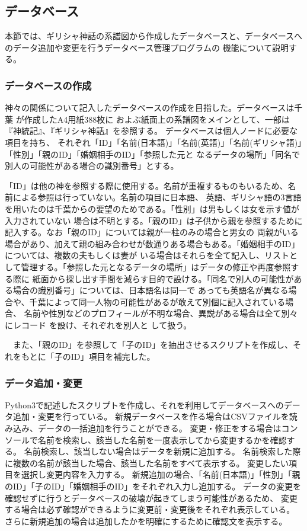 \subsection{データベース}
\label{tag:database}
本節では、ギリシャ神話の系譜図から作成したデータベースと、データベースへのデータ追加や変更を行うデータベース管理プログラムの
機能について説明する。

\subsubsection{データベースの作成}
\label{tag:createDB}
  神々の関係について記入したデータベースの作成を目指した。データベースは千葉\cite{chiba} が作成したA4用紙388枚に
  およぶ紙面上の系譜図をメインとして、一部は『神統記』\cite{theogony}、『ギリシャ神話』\cite{mythology}を参照する。
  データベースは個人ノードに必要な項目を持ち、
  それぞれ「ID」「名前(日本語)」「名前(英語)」「名前(ギリシャ語)」「性別」「親のID」「婚姻相手のID」「参照した元と
  なるデータの場所」「同名で別人の可能性がある場合の識別番号」とする。

  「ID」は他の神を参照する際に使用する。名前が重複するものもいるため、名前による参照は行っていない。名前の項目に日本語、
  英語、ギリシャ語の3言語を用いたのは千葉からの要望のためである。「性別」は男もしくは女を示す値が入力されていない
  場合は不明とする。「親のID」は子供から親を参照するために記入する。なお「親のID」については親が一柱のみの場合と男女の
  両親がいる場合があり、加えて親の組み合わせが数通りある場合もある。「婚姻相手のID」については、複数の夫もしくは妻が
  いる場合はそれらを全て記入し、リストとして管理する。「参照した元となるデータの場所」はデータの修正や再度参照する際に
  紙面から探し出す手間を減らす目的で設ける。「同名で別人の可能性がある場合の識別番号」については、日本語名は同一で
  あっても英語名が異なる場合や、千葉によって同一人物の可能性があるが敢えて別個に記入されている場合、
  名前や性別などのプロフィールが不明な場合、異説がある場合は全て別々にレコード\cite{maria} を設け、それぞれを別人と
  して扱う。

　また、「親のID」を参照して「子のID」を抽出させるスクリプトを作成し、それをもとに「子のID」項目を補完した。

\subsubsection{データ追加・変更}
\label{tag:addDB}
Python3で記述したスクリプトを作成し、それを利用してデータベースへのデータ追加・変更を行っている。
新規データベースを作る場合はCSVファイルを読み込み、データの一括追加を行うことができる。
変更・修正をする場合はコンソールで名前を検索し、該当した名前を一度表示してから変更するかを確認する。
名前検索し、該当しない場合はデータを新規に追加する。
名前検索した際に複数の名前が該当した場合、該当した名前をすべて表示する。
変更したい項目を選択し変更内容を入力する。
新規追加の場合、「名前(日本語)」「性別」「親のID」「子のID」「婚姻相手のID」をそれぞれ入力し追加する。
データの変更を確認せずに行うとデータベースの破壊が起きてしまう可能性があるため、
変更する場合は必ず確認ができるように変更前・変更後をそれぞれ表示している。
さらに新規追加の場合は追加したかを明確にするために確認文を表示する。

